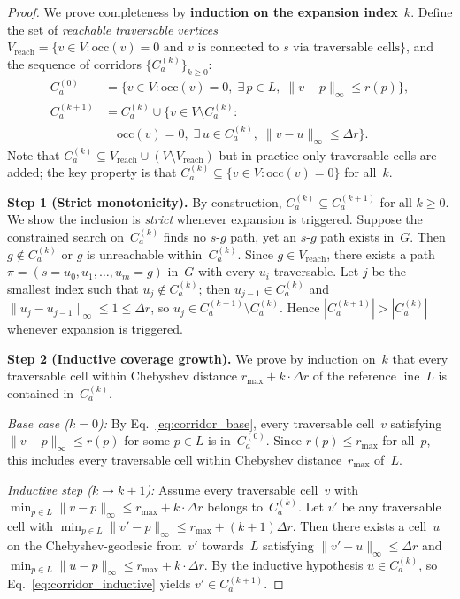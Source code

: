 \documentclass[journal]{IEEEtran}
\begin{document}
\begin{proof}
We prove completeness by \textbf{induction on the expansion index}~$k$.
Define the set of \emph{reachable traversable vertices} $V_{\mathrm{reach}} = \{v \in V : \mathrm{occ}(v)=0 \text{ and } v \text{ is connected to } s \text{ via traversable cells}\}$, and the sequence of corridors $\{C_a^{(k)}\}_{k \geq 0}$:
\begin{align}
    C_a^{(0)} &= \bigl\{v \in V : \mathrm{occ}(v)=0,\;
        \exists\, p \in L,\; \|v-p\|_{\infty} \leq r(p)\bigr\}, \label{eq:corridor_base} \\
    C_a^{(k+1)} &= C_a^{(k)} \cup \bigl\{v \in V \setminus C_a^{(k)} :\nonumber\\
        &\quad \mathrm{occ}(v)=0,\;
        \exists\, u \in C_a^{(k)},\; \|v-u\|_{\infty} \leq \Delta r\bigr\}. \label{eq:corridor_inductive}
\end{align}
Note that $C_a^{(k)} \subseteq V_{\mathrm{reach}} \cup (V \setminus V_{\mathrm{reach}})$ but in practice only traversable cells are added; the key property is that $C_a^{(k)} \subseteq \{v \in V : \mathrm{occ}(v) = 0\}$ for all~$k$.

\noindent\textbf{Step 1 (Strict monotonicity).}
By construction, $C_a^{(k)} \subseteq C_a^{(k+1)}$ for all $k \geq 0$.
We show the inclusion is \emph{strict} whenever expansion is triggered.
Suppose the constrained search on~$C_a^{(k)}$ finds no $s$-$g$ path, yet an $s$-$g$ path exists in~$G$.
Then $g \notin C_a^{(k)}$ or $g$ is unreachable within~$C_a^{(k)}$.
Since $g \in V_{\mathrm{reach}}$, there exists a path $\pi = (s = u_0, u_1, \ldots, u_m = g)$ in~$G$ with every $u_i$ traversable.
Let $j$ be the smallest index such that $u_j \notin C_a^{(k)}$; then $u_{j-1} \in C_a^{(k)}$ and $\|u_j - u_{j-1}\|_{\infty} \leq 1 \leq \Delta r$, so $u_j \in C_a^{(k+1)} \setminus C_a^{(k)}$.
Hence $|C_a^{(k+1)}| > |C_a^{(k)}|$ whenever expansion is triggered.

\noindent\textbf{Step 2 (Inductive coverage growth).}
We prove by induction on~$k$ that every traversable cell within Chebyshev distance $r_{\max} + k \cdot \Delta r$ of the reference line~$L$ is contained in~$C_a^{(k)}$.

\emph{Base case ($k=0$):}
By Eq.~\eqref{eq:corridor_base}, every traversable cell~$v$ satisfying $\|v - p\|_{\infty} \leq r(p)$ for some $p \in L$ is in~$C_a^{(0)}$.
Since $r(p) \leq r_{\max}$ for all~$p$, this includes every traversable cell within Chebyshev distance~$r_{\max}$ of~$L$.

\emph{Inductive step ($k \to k{+}1$):}
Assume every traversable cell~$v$ with $\min_{p \in L}\|v-p\|_{\infty} \leq r_{\max} + k \cdot \Delta r$ belongs to~$C_a^{(k)}$.
Let $v'$ be any traversable cell with $\min_{p \in L}\|v'-p\|_{\infty} \leq r_{\max} + (k{+}1)\Delta r$.
Then there exists a cell~$u$ on the Chebyshev-geodesic from~$v'$ towards~$L$ satisfying $\|v' - u\|_{\infty} \leq \Delta r$ and $\min_{p \in L}\|u-p\|_{\infty} \leq r_{\max} + k \cdot \Delta r$.
By the inductive hypothesis $u \in C_a^{(k)}$, so Eq.~\eqref{eq:corridor_inductive} yields $v' \in C_a^{(k+1)}$.


\end{proof}
\end{document}

